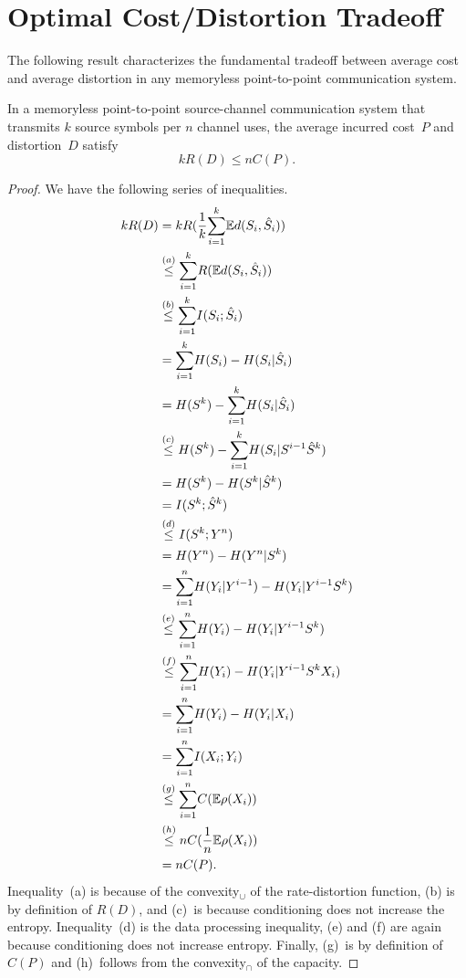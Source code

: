 \section{Optimal Cost/Distortion Tradeoff}
\label{sec:fboptimality}

The following result characterizes the fundamental tradeoff between average cost
and average distortion in any memoryless point-to-point communication system.

\begin{theorem}
  \label{thm:feedbackconv}
  In a memoryless point-to-point source-channel communication system that
  transmits $k$ source symbols per $n$ channel uses, the average incurred
  cost~$P$ and distortion~$D$ satisfy
  \begin{equation}
    \label{eq:feedbackconv}
    k R(D) \le n C(P).
  \end{equation}
\end{theorem}

\begin{proof}
  We have the following series of inequalities.
  {\allowdisplaybreaks
  \begin{align*}
    kR(D) &= k R(\frac1k {\sum_{i=1}^k} \mathbb{E} d(S_i, {\hat{S}}_i)) \\
    &\stackrel{(a)}{\le} {\sum_{i=1}^k} R(\mathbb{E} d(S_i, {\hat{S}}_i)) \\
    &\stackrel{(b)}{\le} {\sum_{i=1}^k} I(S_i; {\hat{S}}_i) \\
    &= {\sum_{i=1}^k} H(S_i) - H(S_i|{\hat{S}}_i) \\
    &= H(S^k) - {\sum_{i=1}^k} H(S_i|{\hat{S}}_i) \\
    &\stackrel{(c)}{\le} H(S^k) - {\sum_{i=1}^k} H(S_i|S^{i-1} {\hat{S}}^k) \\
    &=H(S^k) - H(S^k|{\hat{S}}^k) \\
    &=I(S^k;{\hat{S}}^k) \\
    &\stackrel{(d)}{\le} I(S^k; Y^n) \\
    &= H(Y^n) - H(Y^n|S^k) \\
    &= {\sum_{i=1}^n} H(Y_i|Y^{i-1}) - H(Y_i|Y^{i-1} S^k)  \\
    &\stackrel{(e)}{\le} {\sum_{i=1}^n} H(Y_i) - H(Y_i|Y^{i-1} S^k) \\
    &\stackrel{(f)}{\le} {\sum_{i=1}^n} H(Y_i) - H(Y_i|Y^{i-1} S^k X_i) \\
    &= {\sum_{i=1}^n} H(Y_i) - H(Y_i|X_i) \\
    &= {\sum_{i=1}^n} I(X_i; Y_i) \\
    &\stackrel{(g)}{\le} {\sum_{i=1}^n} C(\mathbb{E} \rho(X_i)) \\
    &\stackrel{(h)}{\le} n C(\frac1n \mathbb{E} \rho(X_i)) \\
    &= n C(P).
  \end{align*}}
  Inequality~(a) is because of the convexity$_\cup$ of the rate-distortion
  function, (b) is by definition of $R(D)$, and (c)~is because conditioning does
  not increase the entropy. Inequality~(d) is the data processing inequality,
  (e) and (f) are again because conditioning does not increase entropy. Finally,
  (g)~is by definition of~$C(P)$ and (h)~follows from the convexity$_\cap$ of
  the capacity.
\end{proof}

